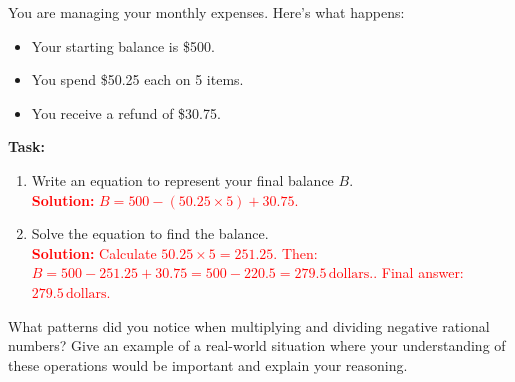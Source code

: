 \documentclass[11pt]{article}
\begin{document}
\vspace{1em}

\begin{tcolorbox}[colframe=black!60, colback=white, 
coltitle=black, colbacktitle=black!15, fonttitle=\bfseries\Large, 
title=Performance Task: Financial Planning with Rational Numbers, halign title=center, left=10pt, right=10pt, top=10pt, bottom=90pt]
You are managing your monthly expenses. Here’s what happens:
\begin{itemize}
    \item Your starting balance is \$500.
    \item You spend \$50.25 each on 5 items.
    \item You receive a refund of \$30.75.
\end{itemize}
\textbf{Task:}
\begin{enumerate}[itemsep=5em]
    \item Write an equation to represent your final balance \(B\).\\
    \textcolor{red}{\textbf{Solution:} \( B = 500 - (50.25 \times 5) + 30.75 \).}

    \item Solve the equation to find the balance.\\
    \textcolor{red}{\textbf{Solution:} Calculate \( 50.25 \times 5 = 251.25 \). Then: \( B = 500 - 251.25 + 30.75 = 500 - 220.5 = 279.5 \, \text{dollars}. \). Final answer: \( 279.5 \, \text{dollars}. \)}
\end{enumerate}
\end{tcolorbox}

\begin{tcolorbox}[colframe=black!60, colback=white, 
coltitle=black, colbacktitle=black!15, fonttitle=\bfseries\Large, 
title=Reflection, halign title=center, left=10pt, right=10pt, top=10pt, bottom=110pt]
What patterns did you notice when multiplying and dividing negative rational numbers? Give an example of a real-world situation where your understanding of these operations would be important and explain your reasoning.
\end{tcolorbox}
\end{document}
